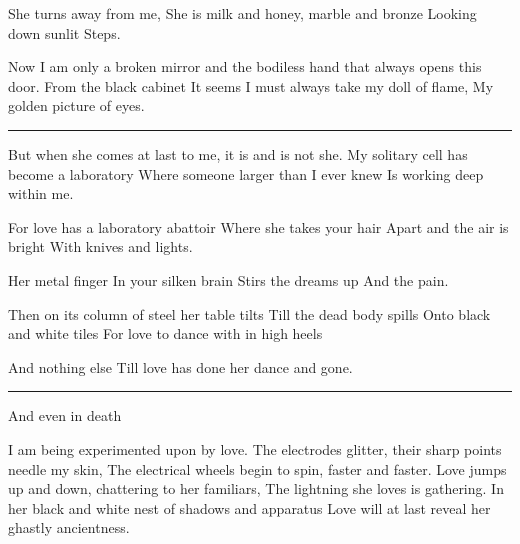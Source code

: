 \documentclass[english,11pt,letterpaper,onecolumn,parskip=full]{scrbook}
\begin{document}
\begin{poem}
\begin{stanza}
She turns away from me,\verseline
She is milk and honey, marble and bronze\verseline
Looking down sunlit\verseline
Steps.
\end{stanza}

\begin{stanza}
Now I am only a broken mirror and the bodiless hand that always opens this door.\verseline
From the black cabinet \verseline
It seems I must always take my doll of flame,\verseline
My golden picture of eyes.
\end{stanza}

\begin{center}\rule[3pt]{2in}{0.5pt}\end{center}

\begin{stanza}
But when she comes at last to me, it is and is not she.\verseline
My solitary cell has become a laboratory\verseline
Where someone larger than I ever knew \verseline
Is working deep within me.
\end{stanza}

\begin{stanza}
For love has a laboratory abattoir\verseline
Where she takes your hair\verseline
Apart and the air is bright\verseline
With knives and lights.
\end{stanza}

\begin{stanza}
Her metal finger \verseline
In your silken brain\verseline
Stirs the dreams up \verseline
And the pain.
\end{stanza}

\begin{stanza}
Then on its column of steel her table tilts\verseline
Till the dead body spills \verseline
Onto black and white tiles\verseline
For love to dance with in high heels 
\end{stanza}

\begin{stanza}
And nothing else\verseline
Till love has done her dance and gone.
\end{stanza}

\begin{center}\rule[3pt]{2in}{0.5pt}\end{center}

\begin{stanza}
And even in death 
\end{stanza}

\begin{stanza}
I am being experimented upon by love.\verseline
The electrodes glitter, their sharp points needle my skin,\verseline
The electrical wheels begin to spin, faster and faster.\verseline
Love jumps up and down, chattering to her familiars,\verseline
The lightning she loves is gathering.\verseline
In her black and white nest of shadows and apparatus\verseline
Love will at last reveal her ghastly ancientness.
\end{stanza}


\end{poem}
\end{document}
